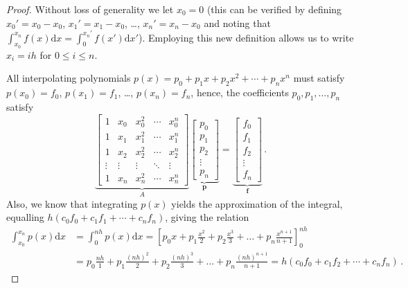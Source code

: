 \documentclass{article}
\begin{document}
\begin{proof}
Without loss of generality we let $x_0 = 0$ (this can be verified by defining $x_0'=x_0-x_0$, $x_1'=x_1-x_0$, \dots, $x_n'=x_n-x_0$ and noting that $\int_{x_0}^{x_n} f(x) \mathrm d x = \int_{0}^{x_n'} f(x') \mathrm dx'$).
Employing this new definition allows us to write $x_i = ih$ for $0 \leq i \leq n$.

All interpolating polynomials $p(x)=p_0 + p_1 x + p_2 x^2 + \cdots + p_n x^n$ must satisfy $p(x_0)=f_0$, $p(x_1)=f_1$, \dots, $p(x_n)=f_n$, hence, the coefficients $p_0, p_1, \dots, p_n$ satisfy
\begin{equation}
    \underbrace{\begin{bmatrix}
        1&x_0&x_0^2&\cdots&x_0^n \\
        1&x_1&x_1^2&\cdots&x_1^n \\
        1&x_2&x_2^2&\cdots&x_2^n \\
        \vdots&\vdots & \vdots & \ddots & \vdots\\
        1&x_n&x_n^2&\cdots&x_n^n
    \end{bmatrix}}_{A}
    \underbrace{\begin{bmatrix}
        p_0\\
        p_1\\
        p_2\\
        \vdots \\
        p_n
    \end{bmatrix}}_{\mathbf p}
    =
    \underbrace{\begin{bmatrix}
        f_0 \\
        f_1 \\
        f_2 \\
        \vdots \\
        f_n
    \end{bmatrix}}_{\mathbf f} \,.\label{eq:mat1}
\end{equation}
Also, we know that integrating $p(x)$ yields the approximation of the integral, equalling $h(c_0 f_0 + c_1f_1 + \cdots + c_nf_n)$, giving the relation
\begin{align}
    \int_{x_0}^{x_n} p(x) \mathrm d x &=
    \int_{0}^{nh} p(x) \mathrm d x =
    \left[ p_0 x + p_1 \frac{x^2}{2} + p_2 \frac{x^3}{3} + \dots + p_n \frac{x^{n+1}}{n+1} \right]_{0}^{nh} \nonumber \\
                                      &= p_0 \frac{nh}{1} + p_1 \frac{(nh)^2}{2} + p_2 \frac{(nh)^3}{3} + \dots + p_n \frac{(nh)^{n+1}}{n+1} = h(c_0 f_0 + c_1 f_2 + \cdots + c_n f_n) \,. \nonumber

\end{align}
\end{proof}
\end{document}
